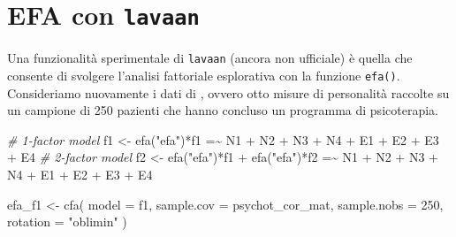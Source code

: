 \documentclass[
  11pt,
]{krantz}
\makeatletter
\newenvironment{Shaded}{\begin{snugshade}}{\end{snugshade}}
\newcommand{\AttributeTok}[1]{\textcolor[rgb]{0.61,0.61,0.61}{#1}}
\newcommand{\CommentTok}[1]{\textcolor[rgb]{0.37,0.37,0.37}{\textit{#1}}}
\newcommand{\DecValTok}[1]{\textcolor[rgb]{0.06,0.06,0.06}{#1}}
\newcommand{\FunctionTok}[1]{\textcolor[rgb]{0,0,0}{#1}}
\newcommand{\NormalTok}[1]{#1}
\newcommand{\OtherTok}[1]{\textcolor[rgb]{0.37,0.37,0.37}{#1}}
\newcommand{\StringTok}[1]{\textcolor[rgb]{0.5,0.5,0.5}{#1}}
\newenvironment{kframe}{%
\medskip{}
\setlength{\fboxsep}{.8em}
 \def\at@end@of@kframe{}%
 \ifinner\ifhmode%
  \def\at@end@of@kframe{\end{minipage}}%
  \begin{minipage}{\columnwidth}%
 \fi\fi%
 \def\FrameCommand##1{\hskip\@totalleftmargin \hskip-\fboxsep
 \colorbox{shadecolor}{##1}\hskip-\fboxsep
     \hskip-\linewidth \hskip-\@totalleftmargin \hskip\columnwidth}%
 \MakeFramed {\advance\hsize-\width
   \@totalleftmargin\z@ \linewidth\hsize
   \@setminipage}}%
 {\par\unskip\endMakeFramed%
 \at@end@of@kframe}
\renewenvironment{Shaded}{\begin{kframe}}{\end{kframe}}
\theoremstyle{definition}
\theoremstyle{definition}
\theoremstyle{definition}
\theoremstyle{definition}
\theoremstyle{remark}
\makeatother
\begin{document}
\hypertarget{efa-con-lavaan}{%
\section{\texorpdfstring{EFA con \texttt{lavaan}}{EFA con lavaan}}\label{efa-con-lavaan}}

Una funzionalità sperimentale di \texttt{lavaan} (ancora non ufficiale) è quella che consente di svolgere l'analisi fattoriale esplorativa con la funzione \texttt{efa()}. Consideriamo nuovamente i dati di \citet{brown2015confirmatory}, ovvero otto misure di personalità raccolte su un campione di 250 pazienti che hanno concluso un programma di psicoterapia.

\begin{Shaded}
\begin{Highlighting}[]
\CommentTok{\# 1{-}factor model}
\NormalTok{f1 }\OtherTok{\textless{}{-}} \StringTok{\textquotesingle{}}
\StringTok{efa("efa")*f1 =\textasciitilde{} N1 + N2 + N3 + N4 + E1 + E2 + E3 + E4}
\StringTok{\textquotesingle{}}
\CommentTok{\# 2{-}factor model}
\NormalTok{f2 }\OtherTok{\textless{}{-}} \StringTok{\textquotesingle{}}
\StringTok{efa("efa")*f1 +}
\StringTok{efa("efa")*f2 =\textasciitilde{} N1 + N2 + N3 + N4 + E1 + E2 + E3 + E4}
\StringTok{\textquotesingle{}}
\end{Highlighting}
\end{Shaded}

\begin{Shaded}
\begin{Highlighting}[]
\NormalTok{efa\_f1 }\OtherTok{\textless{}{-}}
  \FunctionTok{cfa}\NormalTok{(}
    \AttributeTok{model =}\NormalTok{ f1,}
    \AttributeTok{sample.cov =}\NormalTok{ psychot\_cor\_mat,}
    \AttributeTok{sample.nobs =} \DecValTok{250}\NormalTok{,}
    \AttributeTok{rotation =} \StringTok{"oblimin"}
\NormalTok{  )}
\end{Highlighting}
\end{Shaded}
\end{document}

